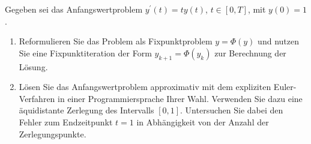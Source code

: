 \begin{exercise}

Gegeben sei das Anfangswertproblem $y^\prime(t) = t y(t)$, $t \in [0, T]$, mit $y(0) = 1$.

\begin{enumerate}[label = \textbf{\alph*)}]

  \item
  Reformulieren Sie das Problem als Fixpunktproblem $y = \Phi(y)$ und nutzen Sie eine Fixpunktiteration der Form $y_{k+1} = \Phi(y_k)$ zur Berechnung der Lösung.

  \item
  Lösen Sie das Anfangswertproblem approximativ mit dem expliziten Euler-Verfahren in einer
  Programmiersprache Ihrer Wahl.
  Verwenden Sie dazu eine äquidistante Zerlegung des Intervalls $[0, 1]$.
  Untersuchen Sie dabei den Fehler zum Endzeitpunkt $t = 1$ in Abhängigkeit von der Anzahl der Zerlegungspunkte.

\end{enumerate}

\end{exercise}

